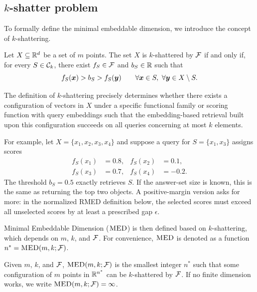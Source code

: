 \documentclass{article}
\begin{document}
\subsection{$k$-shatter problem}
To formally define the minimal embeddable dimension, we introduce the concept of $k$-shattering.
\begin{definition}[$k$-shattering]
    Let $X\subseteq \mathbb{R}^d$ be a set of $m$ points. The set $X$ is $k$-shattered by $\mathcal{F}$ if and only if, for every $S\in \mathcal{C}_k$, there exist $f_S\in \mathcal{F}$ and $b_S\in \mathbb{R}$ such that
    \[
        f_S(\bm{x})>b_S>f_S(\bm{y})
        \qquad
        \forall \bm{x}\in S,\ \forall \bm{y}\in X\setminus S .
    \]
\end{definition}

\begin{remark}
    The definition of $k$-shattering precisely determines whether there exists a configuration of vectors in $X$ under a specific functional family or scoring function with query embeddings such that the embedding-based retrieval built upon this configuration succeeds on all queries concerning at most $k$ elements.
\end{remark}

For example, let $X=\{x_1,x_2,x_3,x_4\}$ and suppose a query for $S=\{x_1,x_3\}$ assigns scores
\begin{align*}
    f_S(x_1)&=0.8, & f_S(x_2)&=0.1,\\
    f_S(x_3)&=0.7, & f_S(x_4)&=-0.2 .
\end{align*}
The threshold $b_S=0.5$ exactly retrieves $S$. If the answer-set size is known, this is the same as returning the top two objects. A positive-margin version asks for more: in the normalized RMED definition below, the selected scores must exceed all unselected scores by at least a prescribed gap $\epsilon$.

Minimal Embeddable Dimension ($\textsc{MED}$) is then defined based on $k$-shattering, which depends on $m$, $k$, and $\mathcal{F}$. For convenience, $\textsc{MED}$ is denoted as a function $n^*=\textsc{MED}(m, k; \mathcal{F})$.
\begin{definition}\label{def:med}
    Given $m$, $k$, and $\mathcal{F}$, $\textsc{MED}(m,k;\mathcal{F})$ is the smallest integer $n^*$ such that some configuration of $m$ points in $\mathbb{R}^{n^*}$ can be $k$-shattered by $\mathcal{F}$. If no finite dimension works, we write $\textsc{MED}(m,k;\mathcal{F})=\infty$.
\end{definition}
\end{document}
